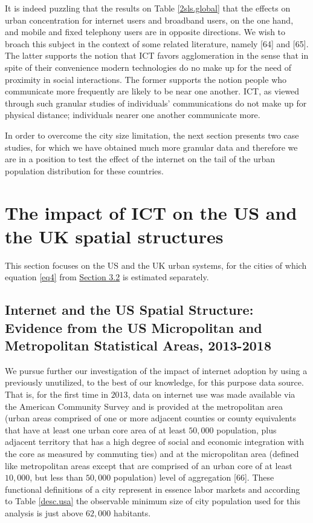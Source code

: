 \documentclass[10pt,letterpaper]{article}
\begin{document}
It is indeed puzzling that the results on Table \ref{2sls.global} that
the effects on urban concentration for internet users and broadband
users, on the one hand, and mobile and fixed telephony users are in
opposite directions. We wish to broach this subject in the context of
some related literature, namely {[}64{]} and {[}65{]}. The latter
supports the notion that ICT favors agglomeration in the sense that in
spite of their convenience modern technologies do no make up for the
need of proximity in social interactions. The former supports the notion
people who communicate more frequently are likely to be near one
another. ICT, as viewed through such granular studies of individuals'
communications do not make up for physical distance; individuals nearer
one another communicate more.\\
\color{black}

In order to overcome the city size limitation, the next section presents
two case studies, for which we have obtained much more granular data and
therefore we are in a position to test the effect of the internet on the
tail of the urban population distribution for these countries.

\hypertarget{sec5}{%
\section{The impact of ICT on the US and the UK spatial
structures}\label{sec5}}

This section focuses on the US and the UK urban systems, for the cities
of which equation \ref{eq4} from \protect\hyperlink{sec3.2}{Section 3.2}
is estimated separately.

\hypertarget{sec5.1}{%
\subsection{Internet and the US Spatial Structure: Evidence from the US
Micropolitan and Metropolitan Statistical Areas,
2013-2018}\label{sec5.1}}

We pursue further our investigation of the impact of internet adoption
by using a previously unutilized, to the best of our knowledge, for this
purpose data source. That is, for the first time in \(2013\), data on
internet use was made available via the American Community Survey and is
provided at the metropolitan area (urban areas comprised of one or more
adjacent counties or county equivalents that have at least one urban
core area of at least \(50,000\) population, plus adjacent territory
that has a high degree of social and economic integration with the core
as measured by commuting ties) and at the micropolitan area (defined
like metropolitan areas except that are comprised of an urban core of at
least \(10,000\), but less than \(50,000\) population) level of
aggregation {[}66{]}. These functional definitions of a city represent
in essence labor markets and according to Table \ref{desc.usa} the
observable minimum size of city population used for this analysis is
just above \(62,000\) habitants.
\end{document}
